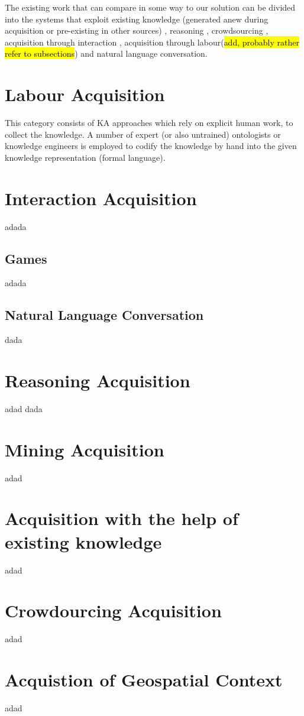 The existing work that can compare in some way to our solution can be divided into the systems that exploit existing knowledge (generated anew during acquisition or pre-existing in other sources) \parencite{Singh2002a,Witbrock2003,Forbus2007,Kvo2010,Sharma2010,Mitchel2015}, reasoning \parencite{Witbrock2003,Speer2007,Speer2008,Kuo2010}, crowdsourcing \parencite{Singh2002,Speer2009, Kuo2010, Pedro2012a, Pedro2013}, acquisition through interaction \parencite{Speer2009,Pedro2012,Pedro2013}, acquisition through labour(\hl{add, probably rather refer to subsections}) \parencite{} and natural language conversation\parencite{Pedro2012, Speer2007,Speer2009, Witbrock2003,Kuo2010}.

\section{Labour Acquisition}
This category consists of KA approaches which rely on explicit human work, to collect the knowledge. A number of expert (or also untrained) ontologists or knowledge engineers is employed to codify the knowledge by hand into the given knowledge representation (formal language).

\section{Interaction Acquisition}
adada
\subsection{Games}
adada
\subsection{Natural Language Conversation}
dada

\section{Reasoning Acquisition}
adad dada

\section{Mining Acquisition}
adad

\section{Acquisition with the help of existing knowledge}
adad

\section{Crowdourcing Acquisition}
adad

\section{Acquistion of Geospatial Context}
adad

